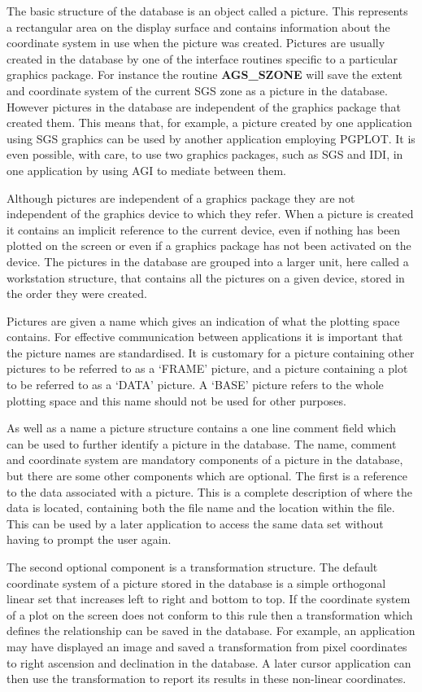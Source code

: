 The basic structure of the database is an object called a picture. This
represents a rectangular area on the display surface and contains
information about the coordinate system in use when the picture was
created. Pictures are usually created in the database by one of the
interface routines specific to a particular graphics package. For
instance the routine {\bf AGS\_SZONE} will save the extent and coordinate
system of the current SGS zone as a picture in the database. However
pictures in the database are independent of the graphics package that
created them. This means that, for example, a picture created by one
application using SGS graphics can be used by another application
employing PGPLOT. It is even possible, with care, to use two graphics
packages, such as SGS and IDI, in one application by using AGI to
mediate between them.

Although pictures are independent of a graphics package they are not
independent of the graphics device to which they refer. When a picture
is created it contains an implicit reference to the current device,
even if nothing has been plotted on the screen or even if a graphics
package has not been activated on the device.
The pictures in the database are grouped into a larger unit, here called
a workstation structure, that contains all the pictures on a given device,
stored in the order they were created.

Pictures are given a name which gives an indication of what the plotting
space contains. For effective communication between applications it is
important that the picture names are standardised. It is customary for
a picture containing other pictures to be referred to as a `FRAME' picture,
and a picture containing a plot to be referred to as a `DATA' picture.
A `BASE' picture refers to the whole plotting space and this name should
not be used for other purposes.

As well as a name a picture structure contains a one line comment field
which can be used to further identify a picture in the database. The name,
comment and coordinate system are mandatory components of a picture in
the database, but there are some other components which are optional.
The first is a reference to the data associated with a picture. This
is a complete description of where the data is located, containing both
the file name and the location within the file. This can be used by a
later application to access the same data set without having to prompt
the user again.

The second optional component is a transformation structure.
The default coordinate system of a picture stored in the database is a
simple orthogonal linear set that increases left to right and bottom to top.
If the coordinate system of a plot on the screen does not conform to this
rule then a transformation which defines the relationship can
be saved in the database.
For example, an application may have displayed an image and saved a
transformation from pixel coordinates to right ascension and declination
in the database. A later cursor application can then use the transformation
to report its results in these non-linear coordinates.

